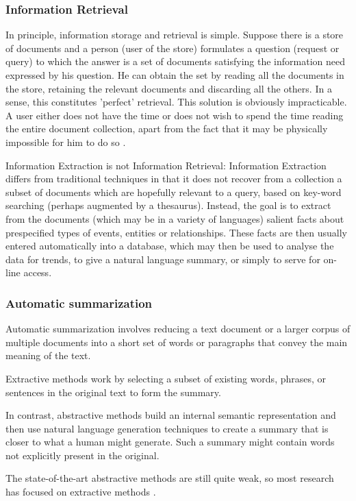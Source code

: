 \subsubsection{Information Retrieval}
In principle, information storage and retrieval is simple. Suppose there is a store of documents and a person (user of the store) formulates a question (request or query) to which the answer is a set of documents satisfying the information need expressed by his question. He can obtain the set by reading all the documents in the store, retaining the relevant documents and discarding all the others. In a sense, this constitutes 'perfect' retrieval. This solution is obviously impracticable. A user either does not have the time or does not wish to spend the time reading the entire document collection, apart from the fact that it may be physically impossible for him to do so \cite{Rijsbergen:1979}. 

Information Extraction is not Information Retrieval: Information Extraction differs from traditional techniques in that it does not recover from a collection a subset of documents which are hopefully relevant to a query, based on key-word searching (perhaps augmented by a thesaurus). Instead, the goal is to extract from the documents (which may be in a variety of languages) salient facts about prespecified types of events, entities or relationships. These facts are then usually entered automatically into a database, which may then be used to analyse the data for trends, to give a natural language summary, or simply to serve for on-line access. \cite{GATE:IE}

\subsubsection{Automatic summarization}
Automatic summarization involves reducing a text document or a larger corpus of multiple documents into a short set of words or paragraphs that convey the main meaning of the text.

Extractive methods work by selecting a subset of existing words, phrases, or sentences in the original text to form the summary.

In contrast, abstractive methods build an internal semantic representation and then use natural language generation techniques to create a summary that is closer to what a human might generate. Such a summary might contain words not explicitly present in the original.

The state-of-the-art abstractive methods are still quite weak, so most research has focused on extractive methods \cite{Goldberg:2007}. 

